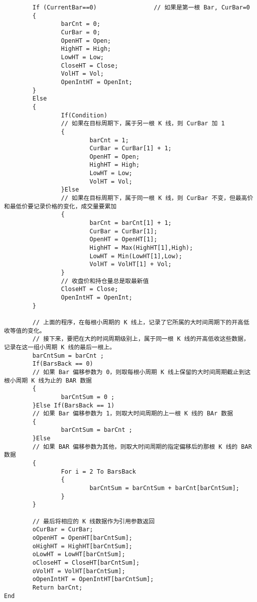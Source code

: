 \documentclass[11pt]{ctexart}
\begin{document}
\begin{enumerate}
\begin{verbatim}
        If (CurrentBar==0)                // 如果是第一根 Bar, CurBar=0
        {
                barCnt = 0;
                CurBar = 0;
                OpenHT = Open;
                HighHT = High;
                LowHT = Low;
                CloseHT = Close;
                VolHT = Vol;
                OpenIntHT = OpenInt;
        }
        Else
        {
                If(Condition)                
                // 如果在目标周期下，属于另一根 K 线，则 CurBar 加 1
                {
                        barCnt = 1;
                        CurBar = CurBar[1] + 1;
                        OpenHT = Open;
                        HighHT = High;
                        LowHT = Low;
                        VolHT = Vol;
                }Else
                // 如果在目标周期下，属于同一根 K 线，则 CurBar 不变，但最高价和最低价要记录价格的变化，成交量要累加
                {
                        barCnt = barCnt[1] + 1;
                        CurBar = CurBar[1];
                        OpenHT = OpenHT[1];
                        HighHT = Max(HighHT[1],High);
                        LowHT = Min(LowHT[1],Low);
                        VolHT = VolHT[1] + Vol;
                }
                // 收盘价和持仓量总是取最新值
                CloseHT = Close;
                OpenIntHT = OpenInt;
        }

        // 上面的程序，在每根小周期的 K 线上，记录了它所属的大时间周期下的开高低收等值的变化。
        // 接下来，要把在大的时间周期级别上，属于同一根 K 线的开高低收这些数据，记录在这一组小周期 K 线的最后一根上。
        barCntSum = barCnt ;
        If(BarsBack == 0)
        // 如果 Bar 偏移参数为 0，则取每根小周期 K 线上保留的大时间周期截止到这根小周期 K 线为止的 BAR 数据
        {
                barCntSum = 0 ;
        }Else If(BarsBack == 1)
        // 如果 Bar 偏移参数为 1，则取大时间周期的上一根 K 线的 BAr 数据
        {
                barCntSum = barCnt ;
        }Else
        // 如果 BAR 偏移参数为其他，则取大时间周期的指定偏移后的那根 K 线的 BAR 数据
        {
                For i = 2 To BarsBack
                {
                        barCntSum = barCntSum + barCnt[barCntSum];
                }
        }

        // 最后将相应的 K 线数据作为引用参数返回
        oCurBar = CurBar;
        oOpenHT = OpenHT[barCntSum];
        oHighHT = HighHT[barCntSum];
        oLowHT = LowHT[barCntSum];
        oCloseHT = CloseHT[barCntSum];
        oVolHT = VolHT[barCntSum];
        oOpenIntHT = OpenIntHT[barCntSum];
        Return barCnt;
End
\end{verbatim}


\end{enumerate}
\end{document}
